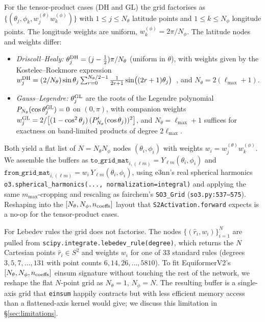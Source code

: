\documentclass{article}
\begin{document}
For the tensor-product cases (DH and GL) the grid factorises as
$\{(\theta_j, \phi_k, w_j^{(\theta)} w_k^{(\phi)})\}$ with $1 \leq j
\leq N_\theta$ latitude points and $1 \leq k \leq N_\phi$ longitude
points. The longitude weights are uniform,
$w_k^{(\phi)} = 2\pi/N_\phi$. The latitude nodes and weights differ:
\begin{itemize}\setlength\itemsep{0pt}
\item \emph{Driscoll--Healy:}
  $\theta_j^{\rm DH} = (j-\tfrac{1}{2})\pi/N_\theta$ (uniform in $\theta$),
  with weights given by the Kostelec--Rockmore expression
  $w_j^{\rm DH} = (2/N_\theta) \sin\theta_j \sum_{r=0}^{N_\theta/2-1}
   \tfrac{1}{2r+1} \sin\bigl((2r+1)\theta_j\bigr)$~\cite{kostelec_rockmore},
  and $N_\theta = 2(\ell_{\max}+1)$.
\item \emph{Gauss--Legendre:} $\theta_j^{\rm GL}$ are the roots of the
  Legendre polynomial $P_{N_\theta}(\cos\theta_j^{\rm GL}) = 0$
  on $(0, \pi)$, with companion weights
  $w_j^{\rm GL} = 2/\bigl[(1-\cos^2\theta_j)\,(P_{N_\theta}'(\cos\theta_j))^2\bigr]$,
  and $N_\theta = \ell_{\max}+1$ suffices for exactness on
  band-limited products of degree $2\ell_{\max}$.
\end{itemize}
Both yield a flat list of $N = N_\theta N_\phi$ nodes
$(\theta_i, \phi_i)$ with weights $w_i = w_j^{(\theta)} w_k^{(\phi)}$.
We assemble the buffers as
$\texttt{to\_grid\_mat}_{i, (\ell m)} = Y_{\ell m}(\theta_i, \phi_i)$
and
$\texttt{from\_grid\_mat}_{i, (\ell m)} = w_i \, Y_{\ell m}(\theta_i, \phi_i)$,
using e3nn's real spherical harmonics
\texttt{o3.spherical\_harmonics(...,
normalization=\textquotesingle integral\textquotesingle)} and applying the same
$m_{\max}$-cropping and rescaling as fairchem's \texttt{SO3\_Grid}
(\texttt{so3.py:537--575}). Reshaping into the
$[N_\theta, N_\phi, n_{\rm coeffs}]$ layout that
\texttt{S2Activation.forward} expects is a no-op for the
tensor-product cases.

For Lebedev rules the grid does not factorise. The nodes
$\{(\hat r_i, w_i)\}_{i=1}^N$ are pulled from
\texttt{scipy.integrate.lebedev\_rule(degree)}, which returns the
$N$ Cartesian points $\hat r_i \in S^2$ and weights $w_i$ for one of
33 standard rules (degrees $3, 5, 7, \ldots, 131$ with point counts
$6, 14, 26, \ldots, 5810$). To fit EquiformerV2's
$[N_\theta, N_\phi, n_{\rm coeffs}]$ einsum signature without
touching the rest of the network, we reshape the flat $N$-point grid
as $N_\theta = 1$, $N_\phi = N$. The resulting buffer is a
single-axis grid that \texttt{einsum} happily contracts but with less
efficient memory access than a flattened-axis kernel would give; we
discuss this limitation in \S\ref{sec:limitations}.
\end{document}
